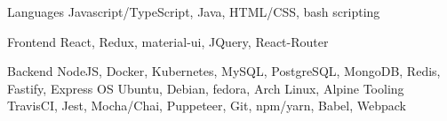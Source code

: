 
\begin{cvskills}
  \cvskill
    {Languages} %
    {Javascript/TypeScript, Java, HTML/CSS, bash scripting} %

  \cvskill
    {Frontend} %
    {React, Redux, material-ui, JQuery, React-Router} %
    
  \cvskill
    {Backend} %
    {NodeJS, Docker, Kubernetes, MySQL, PostgreSQL, MongoDB, Redis, Fastify, Express} %
  \cvskill
    {OS}  %
    {Ubuntu, Debian, fedora, Arch Linux, Alpine}
  \cvskill
    {Tooling}
    {TravisCI, Jest, Mocha/Chai, Puppeteer, Git, npm/yarn, Babel, Webpack}
\end{cvskills}